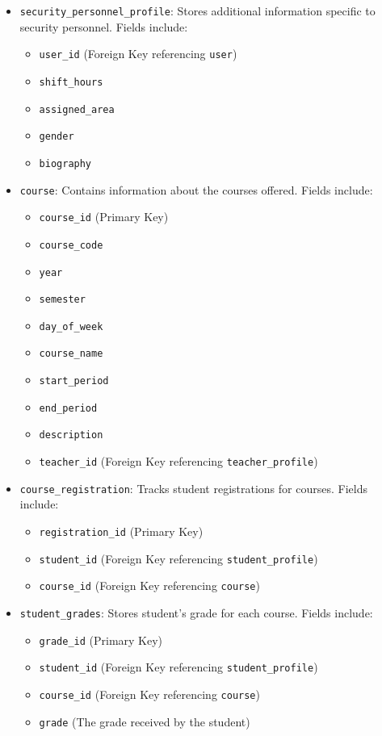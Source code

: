 \documentclass[12pt]{article}
\begin{document}
\begin{itemize}
    \clearpage  %

    \item \texttt{security\_personnel\_profile}: Stores additional information specific to security personnel. Fields include:
    \begin{itemize}
        \item \texttt{user\_id} (Foreign Key referencing \texttt{user})
        \item \texttt{shift\_hours}
        \item \texttt{assigned\_area}
        \item \texttt{gender}
        \item \texttt{biography}
    \end{itemize}
    

    \item \texttt{course}: Contains information about the courses offered. Fields include:
    \begin{itemize}
        \item \texttt{course\_id} (Primary Key)
        \item \texttt{course\_code}
        \item \texttt{year}
        \item \texttt{semester}
        \item \texttt{day\_of\_week}
        \item \texttt{course\_name}
        \item \texttt{start\_period}
        \item \texttt{end\_period}
        \item \texttt{description}
        \item \texttt{teacher\_id} (Foreign Key referencing \texttt{teacher\_profile})
    \end{itemize}
    
    \item \texttt{course\_registration}: Tracks student registrations for courses. Fields include:
    \begin{itemize}
        \item \texttt{registration\_id} (Primary Key)
        \item \texttt{student\_id} (Foreign Key referencing \texttt{student\_profile})
        \item \texttt{course\_id} (Foreign Key referencing \texttt{course})
    \end{itemize}

    \item \texttt{student\_grades}: Stores student's grade for each course. Fields include:
    \begin{itemize}
        \item \texttt{grade\_id} (Primary Key)
        \item \texttt{student\_id} (Foreign Key referencing \texttt{student\_profile})
        \item \texttt{course\_id} (Foreign Key referencing \texttt{course})
        \item \texttt{grade} (The grade received by the student)
    \end{itemize}


\end{itemize}
\end{document}
